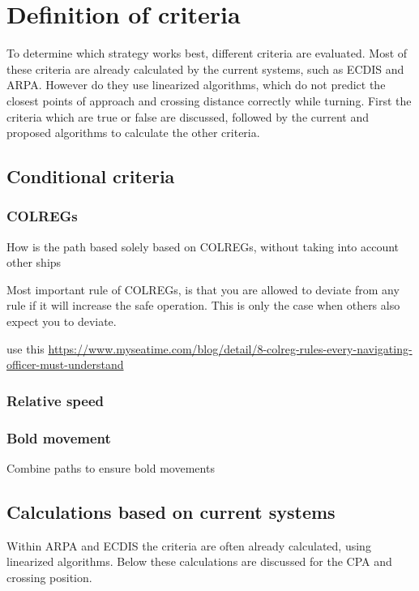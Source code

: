 \chapter{Definition of criteria}
To determine which strategy works best, different criteria are evaluated. Most of these criteria are already calculated by the current systems, such as \ac{ECDIS} and \ac{ARPA}. However do they use linearized algorithms, which do not predict the closest points of approach and crossing distance correctly while turning. First the criteria which are true or false are discussed, followed by the current and proposed algorithms to calculate the other criteria.

\section{Conditional criteria}

\subsection{COLREGs}
How is the path based solely based on COLREGs, without taking into account other ships

Most important rule of \ac{COLREGs}, is that you are allowed to deviate from any rule if it will increase the safe operation. This is only the case when others also expect you to deviate.

use this \url{https://www.myseatime.com/blog/detail/8-colreg-rules-every-navigating-officer-must-understand}

\subsection{Relative speed}

\subsection{Bold movement}
Combine paths to ensure bold movements


\section{Calculations based on current systems}
Within \ac{ARPA} and \ac{ECDIS} the criteria are often already calculated, using linearized algorithms. Below these calculations are discussed for the \ac{CPA} and crossing position.

